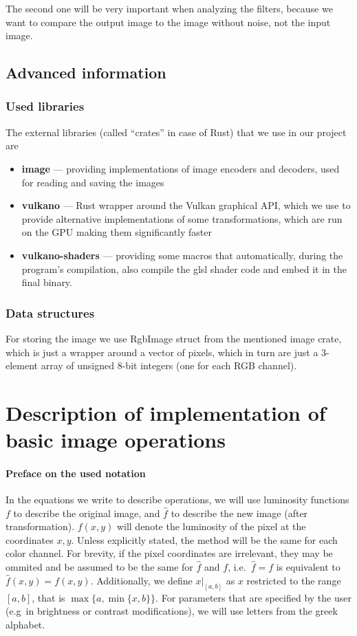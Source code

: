\documentclass[12pt]{article}
\begin{document}
The second one will be very important when analyzing the filters, because we want to compare the output image to the image without noise, not the input image.

\subsection{Advanced information}
\subsubsection{Used libraries}
The external libraries (called ``crates'' in case of Rust) that we use in our project are
\begin{itemize}
    \item \textbf{image} --- providing implementations of image encoders and decoders,
          used for reading and saving the images
    \item \textbf{vulkano} --- Rust wrapper around the Vulkan graphical API,
          which we use to provide alternative implementations of some transformations,
          which are run on the GPU making them significantly faster
    \item \textbf{vulkano-shaders} --- providing some macros that automatically,
          during the program's compilation,
          also compile the glsl shader code and embed it in the final binary.
\end{itemize}

\subsubsection{Data structures}
For storing the image we use RgbImage struct from the mentioned image crate,
which is just a wrapper around a vector of pixels, which in turn are just a 3-element array of unsigned 8-bit integers (one for each RGB channel).

\section{Description of implementation of basic image operations}

\paragraph*{Preface on the used notation}
In the equations we write to describe operations, we will use luminosity functions $f$ to describe the original image, and $\hat{f}$ to describe the new image (after transformation).
$f(x,y)$ will denote the luminosity of the pixel at the coordinates $x,y$. Unless explicitly stated, the method will be the same for each color channel.
For brevity, if the pixel coordinates are irrelevant, they may be ommited and be assumed to be the same for $\hat{f}$ and $f$, i.e.\ $\hat{f}=f$ is equivalent to $\hat{f}(x,y) = f(x,y)$.
Additionally, we define $x|_{[a,b]}$ as $x$ restricted to the range $[a,b]$, that is $\max\{a, \min\{x,b\}\}$.
For parameters that are specified by the user (e.g\ in brightness or contrast modifications), we will use letters from the greek alphabet.
\end{document}
